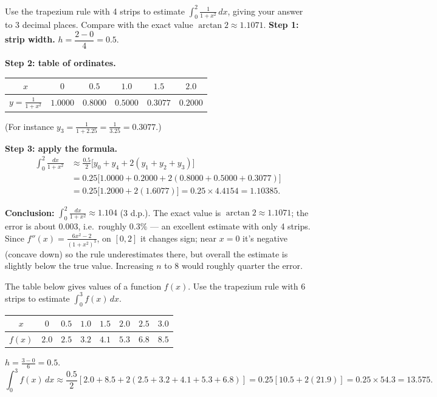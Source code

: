 \documentclass[11pt]{article}
\begin{document}
\begin{exemplebox}
Use the trapezium rule with 4 strips to estimate $\displaystyle\int_0^2 \frac{1}{1+x^2}\,dx$, giving your answer to 3 decimal places. Compare with the exact value $\arctan 2 \approx 1.1071$.
\tcblower
\textbf{Step 1: strip width.} $h = \dfrac{2-0}{4} = 0.5$.

\textbf{Step 2: table of ordinates.}
\begin{center}
\begin{tabular}{|c|c|c|c|c|c|}
\hline
\rowcolor{popblueL} $x$ & $0$ & $0.5$ & $1.0$ & $1.5$ & $2.0$ \\
\hline
$y = \frac{1}{1+x^2}$ & $1.0000$ & $0.8000$ & $0.5000$ & $0.3077$ & $0.2000$ \\
\hline
\end{tabular}
\end{center}
(For instance $y_3 = \frac{1}{1+2.25} = \frac{1}{3.25} = 0.3077$.)

\textbf{Step 3: apply the formula.}
\begin{align*}
\int_0^2 \frac{dx}{1+x^2} &\approx \frac{0.5}{2}\Big[y_0 + y_4 + 2(y_1 + y_2 + y_3)\Big] \\
&= 0.25\Big[1.0000 + 0.2000 + 2(0.8000 + 0.5000 + 0.3077)\Big] \\
&= 0.25\big[1.2000 + 2(1.6077)\big] = 0.25 \times 4.4154 = 1.10385.
\end{align*}

\textbf{Conclusion:} $\displaystyle\int_0^2 \frac{dx}{1+x^2} \approx 1.104$ (3 d.p.). The exact value is $\arctan 2 \approx 1.1071$; the error is about $0.003$, i.e.\ roughly $0.3\%$ — an excellent estimate with only 4 strips. Since $f''(x) = \frac{6x^2-2}{(1+x^2)^3}$, on $[0,2]$ it changes sign; near $x=0$ it's negative (concave down) so the rule underestimates there, but overall the estimate is slightly below the true value. Increasing $n$ to 8 would roughly quarter the error.
\end{exemplebox}

\begin{exemplebox}
The table below gives values of a function $f(x)$. Use the trapezium rule with 6 strips to estimate $\int_0^3 f(x)\,dx$.

\begin{center}
\begin{tabular}{|c|c|c|c|c|c|c|c|}
\hline
\rowcolor{popblueL} $x$ & $0$ & $0.5$ & $1.0$ & $1.5$ & $2.0$ & $2.5$ & $3.0$ \\
\hline
$f(x)$ & $2.0$ & $2.5$ & $3.2$ & $4.1$ & $5.3$ & $6.8$ & $8.5$ \\
\hline
\end{tabular}
\end{center}
\tcblower
$h = \frac{3-0}{6} = 0.5$.
\[
\int_0^3 f(x)\,dx \approx \frac{0.5}{2}\left[ 2.0 + 8.5 + 2(2.5 + 3.2 + 4.1 + 5.3 + 6.8) \right] = 0.25\left[ 10.5 + 2(21.9) \right] = 0.25 \times 54.3 = 13.575.
\]
\end{exemplebox}
\end{document}
